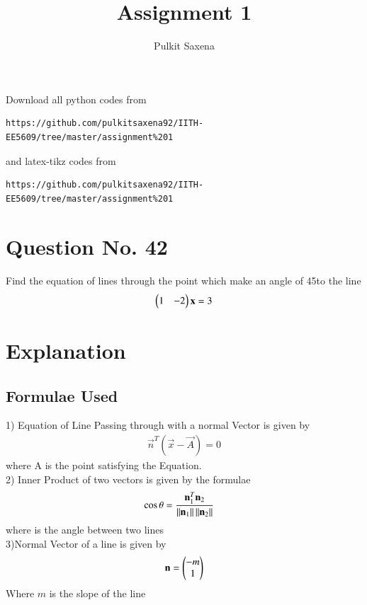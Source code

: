 \documentclass[journal,12pt,twocolumn]{IEEEtran}
\begin{document}
     \def\rightbox#1{\makebox[0in][r]{#1}}
     \def\centbox#1{\makebox[0in]{#1}}
     \def\topbox#1{\raisebox{-\baselineskip}[0in][0in]{#1}}
     \def\midbox#1{\raisebox{-0.5\baselineskip}[0in][0in]{#1}}
\vspace{3cm}
\title{Assignment 1}
\author{Pulkit Saxena}
\maketitle
\newpage
\bigskip
\renewcommand{\thefigure}{\theenumi}
\renewcommand{\thetable}{\theenumi}
%
Download all python codes from 
\begin{lstlisting}
https://github.com/pulkitsaxena92/IITH-EE5609/tree/master/assignment%201
\end{lstlisting}
%
and latex-tikz codes from 
%
\begin{lstlisting}
https://github.com/pulkitsaxena92/IITH-EE5609/tree/master/assignment%201
\end{lstlisting}
\section{Question No. 42}
Find the equation of lines through the point   which make an angle of 45\degree to the line
\begin{align}
\begin{pmatrix}1 & -2\end{pmatrix}\mathbf{x} = 3 
\end{align}
\section{Explanation}
\subsection{Formulae Used}
1) Equation of Line Passing through  with a normal Vector is given by
\begin{align}
\vec{n}^T(\vec{x}-\vec{A})=0 
\end{align}
where A is the point satisfying the Equation.
\\2) Inner Product of two vectors is given by the formulae
\begin{align}
 \cos \theta &= \frac{\mathbf{n}_1^T\mathbf{n}_2}{\left\lVert\mathbf{n}_1\right\rVert\left\lVert\mathbf{n}_2\right\rVert}  
\end{align}
where is the angle between two lines
\\3)Normal Vector of a line is given by
\begin{align}
\Vec{n}=\myvec{-m\\1}
\end{align}
Where $m$ is the slope of the line
\end{document}
